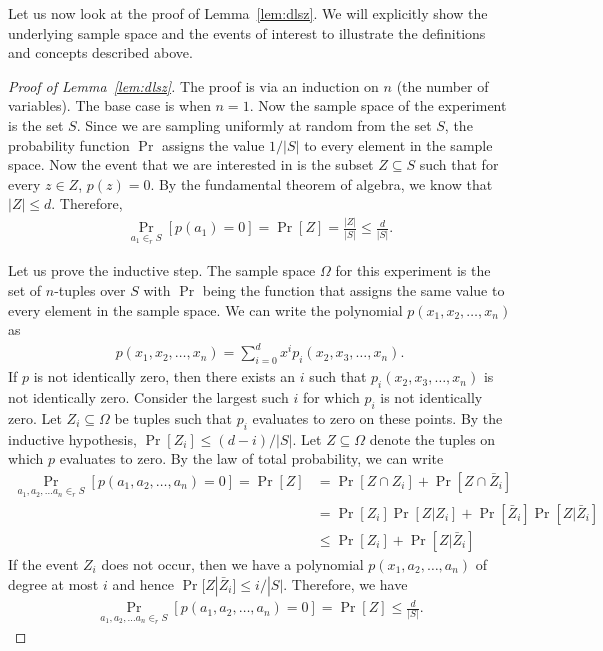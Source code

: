 Let us now look at the proof of Lemma~\ref{lem:dlsz}. We will explicitly show the underlying sample space and the events of interest to illustrate the definitions and concepts described above.
\begin{proof}
	[Proof of Lemma~\ref{lem:dlsz}]
	The proof is via an induction on $n$ (the number of variables). The base case is when $n=1$. Now the sample space of the experiment is the set $S$. Since we are sampling uniformly at random from the set $S$, the probability function $\Pr$ assigns the value $1/|S|$ to every element in the sample space. Now the event that we are interested in is the subset $Z \subseteq S$ such that for every $z\in Z$, $p(z)=0$. By the fundamental theorem of algebra, we know that $|Z| \leq d$. Therefore,
	\begin{align*}
		\Pr_{a_1 \in_r S} \left[p(a_1) = 0\right] = \Pr[Z] = \frac{|Z|}{|S|} \leq \frac{d}{|S|}.
	\end{align*}
	
	Let us prove the inductive step. The sample space $\Omega$ for this experiment is the set of $n$-tuples over $S$ with $\Pr$ being the function that assigns the same value to every element in the sample space. We can write the polynomial $p(x_1, x_2, \ldots, x_n)$ as
	\begin{align*}
		p(x_1, x_2, \ldots, x_n) = \sum_{i=0}^d x^i p_i(x_2, x_3, \ldots, x_n).
	\end{align*}
	If $p$ is not identically zero, then there exists an $i$ such that $p_i(x_2, x_3, \ldots, x_n)$ is not identically zero. Consider the largest such $i$ for which $p_i$ is not identically zero. Let $Z_i \subseteq \Omega$ be tuples such that $p_i$ evaluates to zero on these points. By the inductive hypothesis, $\Pr[Z_i] \leq (d-i)/|S|$. Let $Z \subseteq \Omega$ denote the tuples on which $p$ evaluates to zero. By the law of total probability, we can write
	\begin{align*}
		\Pr_{a_1, a_2, \ldots a_n \in_r S} \left[ p(a_1, a_2, \ldots, a_n) = 0  \right]  = \Pr[Z] &= \Pr[Z\cap Z_i] + \Pr[Z\cap \bar{Z}_i]\\
		&= \Pr[Z_i]\Pr[Z|Z_i] + \Pr[\bar{Z}_i]\Pr[Z|\bar{Z}_i]\\
		&\leq \Pr[Z_i] + \Pr[Z|\bar{Z}_i]
	\end{align*}
	If the event $Z_i$ does not occur, then we have a polynomial $p(x_1, a_2, \ldots, a_n)$ of degree at most $i$ and hence $\Pr[Z|\bar{Z}_i] \leq i/|S|$. Therefore, we have
	\begin{align*}
		\Pr_{a_1, a_2, \ldots a_n \in_r S} \left[ p(a_1, a_2, \ldots, a_n) = 0  \right]  = \Pr[Z] \leq \frac{d}{|S|}.
	\end{align*}
\end{proof}

